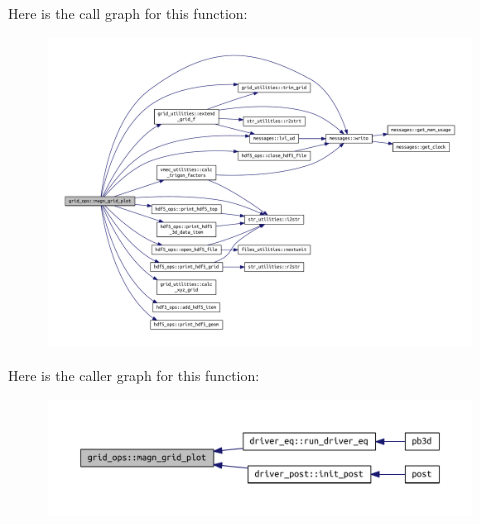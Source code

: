 Here is the call graph for this function\+:\nopagebreak
\begin{figure}[H]
\begin{center}
\leavevmode
\includegraphics[width=350pt]{namespacegrid__ops_addd76b7b3be0b51e0863ae0cdfef41e6_cgraph}
\end{center}
\end{figure}
Here is the caller graph for this function\+:\nopagebreak
\begin{figure}[H]
\begin{center}
\leavevmode
\includegraphics[width=350pt]{namespacegrid__ops_addd76b7b3be0b51e0863ae0cdfef41e6_icgraph}
\end{center}
\end{figure}
\mbox{\label{namespacegrid__ops_a4827e794d37334c0cad9bb2016e64d46}} 

